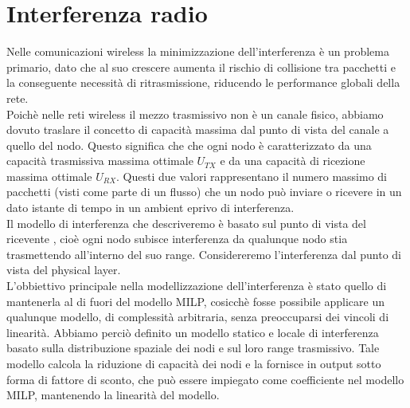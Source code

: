 \section{Interferenza radio}
Nelle comunicazioni wireless la minimizzazione dell'interferenza è un problema primario, dato che al suo crescere aumenta il rischio di collisione tra pacchetti e la conseguente necessità di ritrasmissione, riducendo le performance globali della rete. \\
Poichè nelle reti wireless il mezzo trasmissivo non è un canale fisico, abbiamo dovuto traslare il concetto di capacità massima dal punto di vista del canale a quello del nodo. Questo significa che che ogni nodo è caratterizzato da una capacità trasmissiva massima ottimale $U_{TX}$ e da una capacità di ricezione massima ottimale $U_{RX}$. Questi due valori rappresentano il numero massimo di pacchetti (visti come parte di un flusso) che un nodo può inviare o ricevere in un dato istante di tempo in un ambient eprivo di interferenza. \\
Il modello di interferenza che descriveremo è basato sul punto di vista del ricevente \cite{Rickenbach05arobust}, cioè ogni nodo subisce interferenza da qualunque nodo stia trasmettendo all'interno del suo range. Considereremo l'interferenza dal punto di vista del physical layer. \\
L'obbiettivo principale nella modellizzazione dell'interferenza è stato quello di mantenerla al di fuori del modello MILP, cosicchè fosse possibile applicare un qualunque modello, di complessità arbitraria, senza preoccuparsi dei vincoli di linearità.
Abbiamo perciò definito un modello statico e locale di interferenza basato sulla distribuzione spaziale dei nodi e sul loro range trasmissivo. Tale modello calcola la riduzione di capacità dei nodi e la fornisce in output sotto forma di fattore di sconto, che può essere impiegato come coefficiente nel modello MILP, mantenendo la linearità del modello.

